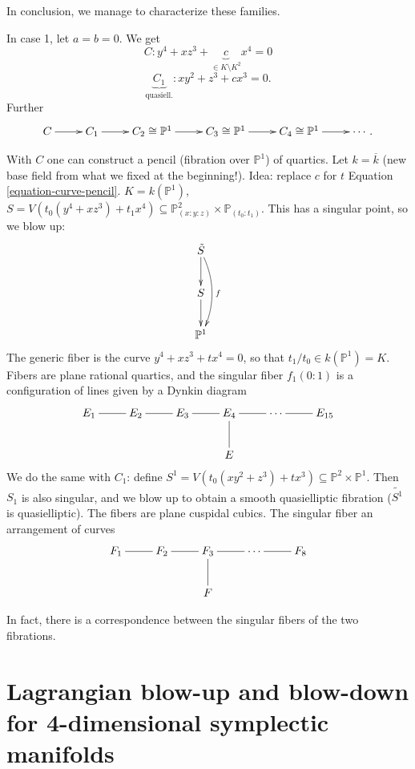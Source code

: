 \noindent
In conclusion, we manage to characterize these families.

\begin{example}
\label{example-chain-of-maps}
In case 1, let $a=b=0$. We get
\begin{equation}
\label{equation-curve-pencil}
C: y^4+xz^3+\underbrace{c}_{\in K\setminus K^2}x^4=0
\end{equation}
$$
\underbrace{C_1}_{\text{quasiell.}}:xy^2+z^3+cx^3=0.
$$
Further
$$
\xymatrix{
C\ar[r]&C_1\ar[r]&C_2 \cong\mathbb{P}^1\ar[r]
&C_3 \cong \mathbb{P}^1\ar[r]&C_4\cong \mathbb{P}^1\ar[r]&\cdots.
}
$$
\end{example}

\medskip\noindent
With $C$ one can construct a pencil (fibration over $\mathbb{P}^1$)
of quartics.
Let $k=\overline{k}$ (new base field from what we fixed at the beginning!).
Idea: replace $c$ for $t$ Equation \ref{equation-curve-pencil}.
 $K=k(\mathbb{P}^1)$, $S=V(t_0(y^4+xz^3)+t_1x^4)
\subseteq \mathbb{P}^2_{(x:y:z)}\times \mathbb{P}_{(t_0:t_1)}$.
This has a singular point, so we blow up:
$$
\xymatrix{
\tilde{S}\ar[d]\ar@/^1em/[dd]^f\\ S\ar[d]\\\mathbb{P}^1
}
$$
The generic fiber is the curve $y^4+xz^3+tx^4=0$,
so that $t_1/t_0 \in k(\mathbb{P}^1)=K$.
Fibers are plane rational quartics,
and the singular fiber $f_1(0:1)$ is a configuration of lines
given by a Dynkin diagram
$$
\xymatrix{
E_1 \ar@{-}[r]& E_2\ar@{-}[r]
& E_3 \ar@{-}[r]& E_4\ar@{-}[d]\ar@{-}[r]
& \cdots \ar@{-}[r]& E_{15}\\
& & & E
}
$$
We do the same with $C_1$: define 
$S^1=V(t_0(xy^2+z^3)+tx^3) \subseteq \mathbb{P}^2 \times \mathbb{P}^1$.
Then $S_1$ is also singular, and we blow up to obtain a smooth
quasielliptic fibration ($\tilde{S^1}$ is quasielliptic).
The fibers are plane cuspidal cubics.
The singular fiber an arrangement of curves
$$
\xymatrix{
F_1 \ar@{-}[r]& F_2\ar@{-}[r]& F_3\ar@{-}[d]\ar@{-}[r]& \cdots \ar@{-}[r]& F_8\\
& & F
}
$$

In fact, there is a correspondence between the 
singular fibers of the two fibrations.



\section{Lagrangian blow-up and blow-down for 4-dimensional symplectic manifolds
}
\label{section-blow-up-down}

